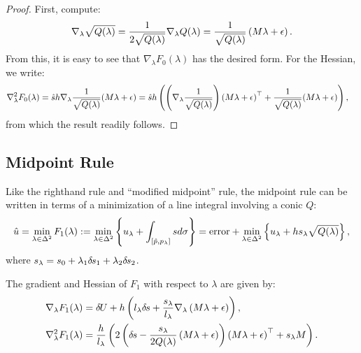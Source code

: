 \documentclass[eikonal.tex]{subfiles}
\begin{document}
\begin{proof}
  First, compute:
  \begin{align*}
    \nabla_\lambda \sqrt{Q(\lambda)} = \frac{1}{2 \sqrt{Q(\lambda)}} \nabla_\lambda Q(\lambda) = \frac{1}{\sqrt{Q(\lambda)}}\left(M\lambda + \epsilon\right).
  \end{align*}
  From this, it is easy to see that $\nabla_\lambda F_0(\lambda)$ has
  the desired form. For the Hessian, we write:
  \begin{align*}
    \nabla_\lambda^2 F_0(\lambda)
    &= \hat{s}h \nabla_\lambda \frac{1}{\sqrt{Q(\lambda)}}{(M\lambda + \epsilon)} = \hat{s}h \left(\left(\nabla_\lambda \frac{1}{\sqrt{Q(\lambda)}}\right) {(M\lambda + \epsilon)}^\top + \frac{1}{\sqrt{Q(\lambda)}} {(M\lambda + \epsilon)}\right),
  \end{align*}
  from which the result readily follows.
\end{proof}

\subsection{Midpoint Rule}

Like the righthand rule and ``modified midpoint'' rule, the midpoint
rule can be written in terms of a minimization of a line integral
involving a conic $Q$:
\begin{align*}
  \hat{u} = \min_{\lambda \in \Delta^2} F_1(\lambda) := \min_{\lambda \in \Delta^2} \left\{u_\lambda + \int_{[\hat{p}, p_\lambda]} sd\sigma\right\} = \mbox{error} + \min_{\lambda \in \Delta^2} \left\{u_\lambda + h s_\lambda \sqrt{Q(\lambda)}\right\},
\end{align*}
where $s_\lambda = s_0 + \lambda_1 {\delta \hspace{-0.1em} s}_1 + \lambda_2 {\delta \hspace{-0.1em} s}_2$.

\begin{lemma}
  The gradient and Hessian of $F_1$ with respect to $\lambda$ are given by:
  \begin{align*}
    \nabla_\lambda F_1(\lambda) &= {\delta \hspace{-0.09em} U} + h \left(l_\lambda {\delta \hspace{-0.1em} s} + \frac{s_\lambda}{l_\lambda} \nabla_\lambda \left(M\lambda + \epsilon\right)\right), \\
    \nabla^2_\lambda F_1(\lambda) &= \frac{h}{l_\lambda} \left(2\left({\delta \hspace{-0.1em} s} - \frac{s_\lambda}{2Q(\lambda)}\left(M\lambda + \epsilon\right)\right)\left(M\lambda + \epsilon\right)^\top + s_\lambda M\right).
  \end{align*}
\end{lemma}
\end{document}
